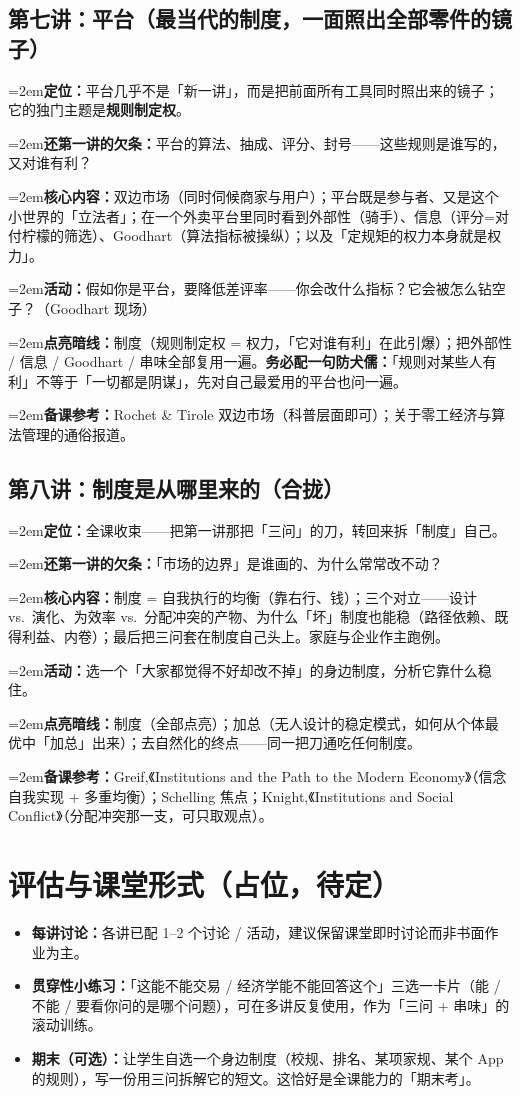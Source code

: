 \documentclass[10pt,a4paper]{ctexart}
\newcommand{\field}[1]{\par\noindent\hangindent=2em\textbf{#1}\hspace{0.3em}}
\begin{document}
\subsection{第七讲：平台（最当代的制度，一面照出全部零件的镜子）}
\field{定位：}平台几乎不是「新一讲」，而是把前面所有工具同时照出来的镜子；它的独门主题是\textbf{规则制定权}。
\field{还第一讲的欠条：}平台的算法、抽成、评分、封号——这些规则是谁写的，又对谁有利？
\field{核心内容：}双边市场（同时伺候商家与用户）；平台既是参与者、又是这个小世界的「立法者」；在一个外卖平台里同时看到外部性（骑手）、信息（评分=对付柠檬的筛选）、Goodhart（算法指标被操纵）；以及「定规矩的权力本身就是权力」。
\field{活动：}假如你是平台，要降低差评率——你会改什么指标？它会被怎么钻空子？（Goodhart 现场）
\field{点亮暗线：}制度（规则制定权 = 权力，「它对谁有利」在此引爆）；把外部性 / 信息 / Goodhart / 串味全部复用一遍。\textbf{务必配一句防犬儒：}「规则对某些人有利」不等于「一切都是阴谋」，先对自己最爱用的平台也问一遍。
\field{备课参考：}Rochet \& Tirole 双边市场（科普层面即可）；关于零工经济与算法管理的通俗报道。

\subsection{第八讲：制度是从哪里来的（合拢）}
\field{定位：}全课收束——把第一讲那把「三问」的刀，转回来拆「制度」自己。
\field{还第一讲的欠条：}「市场的边界」是谁画的、为什么常常改不动？
\field{核心内容：}制度 = 自我执行的均衡（靠右行、钱）；三个对立——设计 vs.\ 演化、为效率 vs.\ 分配冲突的产物、为什么「坏」制度也能稳（路径依赖、既得利益、内卷）；最后把三问套在制度自己头上。家庭与企业作主跑例。
\field{活动：}选一个「大家都觉得不好却改不掉」的身边制度，分析它靠什么稳住。
\field{点亮暗线：}制度（全部点亮）；加总（无人设计的稳定模式，如何从个体最优中「加总」出来）；去自然化的终点——同一把刀通吃任何制度。
\field{备课参考：}Greif,《Institutions and the Path to the Modern Economy》（信念自我实现 + 多重均衡）；Schelling 焦点；Knight,《Institutions and Social Conflict》（分配冲突那一支，可只取观点）。

\section{评估与课堂形式（占位，待定）}

\begin{itemize}
  \item \textbf{每讲讨论：}各讲已配 1--2 个讨论 / 活动，建议保留课堂即时讨论而非书面作业为主。
  \item \textbf{贯穿性小练习：}「这能不能交易 / 经济学能不能回答这个」三选一卡片（能 / 不能 / 要看你问的是哪个问题），可在多讲反复使用，作为「三问 + 串味」的滚动训练。
  \item \textbf{期末（可选）：}让学生自选一个身边制度（校规、排名、某项家规、某个 App 的规则），写一份用三问拆解它的短文。这恰好是全课能力的「期末考」。
\end{itemize}
\end{document}
